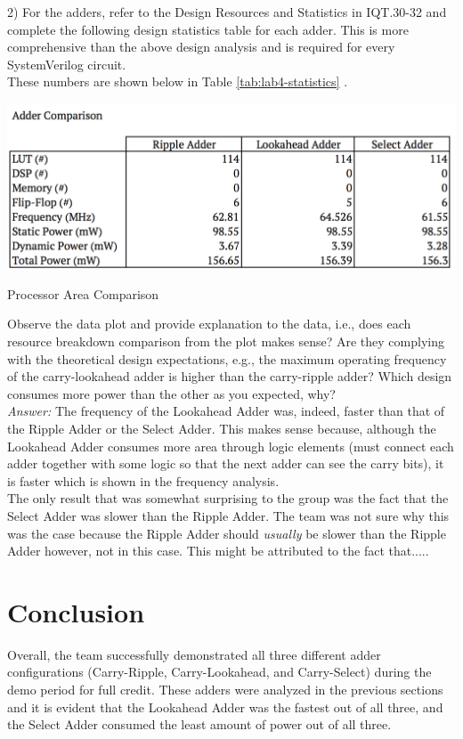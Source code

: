 \documentclass[journal, twocolumn, final,11pt,letterpaper]{IEEEtran}
\begin{document}
2) For the adders, refer to the Design Resources and Statistics in IQT.30-32 and complete
the following design statistics table for each adder. This is more comprehensive than the above
design analysis and is required for every SystemVerilog circuit.\\

These numbers are shown below in Table \ref{tab:lab4-statistics} .

\begin{table} [H]
	\centering
	\includegraphics[scale=0.35]{lab4-statistics.png}
	\caption{Processor Area Comparison\label{tab:lab4-statistics}}
\end{table}

Observe the data plot and provide explanation to the data, i.e., does each resource
breakdown comparison from the plot makes sense? Are they complying with the theoretical
design expectations, e.g., the maximum operating frequency of the carry-lookahead adder is
higher than the carry-ripple adder? Which design consumes more power than the other as you
expected, why?\\

\textit{Answer:} The frequency of the Lookahead Adder was, indeed, faster than that of the Ripple Adder or the Select Adder. This makes sense because, although the Lookahead Adder consumes more area through logic elements (must connect each adder together with some logic so that the next adder can see the carry bits), it is faster which is shown in the frequency analysis.\\

The only result that was somewhat surprising to the group was the fact that the Select Adder was slower than the Ripple Adder. The team was not sure why this was the case because the Ripple Adder should \textit{usually} be slower than the Ripple Adder however, not in this case. This might be attributed to the fact that.....

\section{Conclusion}
Overall, the team successfully demonstrated all three different adder configurations (Carry-Ripple, Carry-Lookahead, and Carry-Select) during the demo period for full credit. These adders were analyzed in the previous sections and it is evident that the Lookahead Adder was the fastest out of all three, and the Select Adder consumed the least amount of power out of all three.\\
\end{document}
